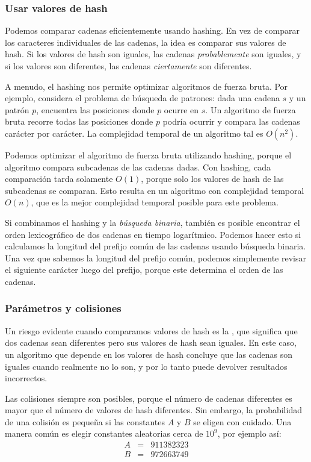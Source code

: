 \subsubsection*{Usar valores de hash}

Podemos comparar cadenas eficientemente usando hashing. En vez
de comparar los caracteres individuales de las cadenas, la idea es comparar
sus valores de hash. Si los valores de hash son iguales, las cadenas
\emph{probablemente} son iguales, y si los valores son diferentes, las
cadenas \emph{ciertamente} son diferentes.

A menudo, el hashing nos permite optimizar algoritmos de fuerza bruta.
Por ejemplo, considera el problema de búsqueda de patrones: dada una cadena
$s$ y un patrón $p$, encuentra las posiciones donde $p$ ocurre en $s$.
Un algoritmo de fuerza bruta recorre todas las posiciones donde $p$
podría ocurrir y compara las cadenas carácter por carácter. La complejidad
temporal de un algoritmo tal es $O(n^2)$.

Podemos optimizar el algoritmo de fuerza bruta utilizando hashing,
porque el algoritmo compara subcadenas de las cadenas dadas.
Con hashing, cada comparación tarda solamente $O(1)$, porque solo
los valores de hash de las subcadenas se comparan. Esto resulta en un
algoritmo con complejidad temporal $O(n)$, que es la mejor complejidad
temporal posible para este problema.

Si combinamos el hashing y la \emph{búsqueda binaria}, también es posible
encontrar el orden lexicográfico de dos cadenas en tiempo logarítmico.
Podemos hacer esto si calculamos la longitud del prefijo común de las
cadenas usando búsqueda binaria. Una vez que sabemos la longitud del
prefijo común, podemos simplemente revisar el siguiente carácter luego
del prefijo, porque este determina el orden de las cadenas.

\subsubsection*{Parámetros y colisiones}


Un riesgo evidente cuando comparamos valores de hash es la ,
que significa que dos cadenas sean diferentes pero sus valores de hash
sean iguales. En este caso, un algoritmo que depende en los valores de hash
concluye que las cadenas son iguales cuando realmente no lo son, y por lo
tanto puede devolver resultados incorrectos.

Las colisiones siempre son posibles, porque el número de cadenas diferentes
es mayor que el número de valores de hash diferentes. Sin embargo, la
probabilidad de una colisión es pequeña si las constantes $A$ y $B$ se
eligen con cuidado. Una manera común es elegir constantes aleatorias cerca
de $10^9$, por ejemplo así:
\[
    \begin{array}{lcl}
        A & = & 911382323 \\
        B & = & 972663749 \\
    \end{array}
\]

